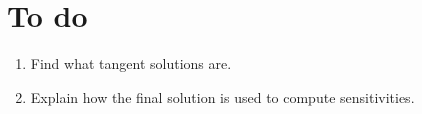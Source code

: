 \documentclass[10pt,twoside,a4paper]{article} %
\begin{document}
\section{To do}

\begin{enumerate}
  \item Find what tangent solutions are.
  \item Explain how the final solution is used to compute sensitivities.
\end{enumerate}





%
%
%
%
%
%
%
%
%
%
%
%
%
%
%
%
%
%
%
\end{document}
